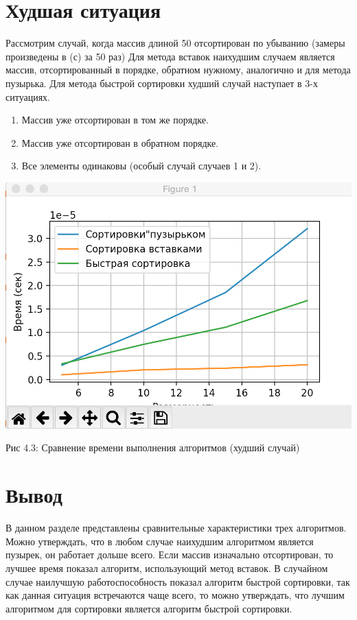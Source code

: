 \documentclass[12pt]{report}
\begin{document}
\section{Худшая ситуация}
Рассмотрим случай, когда массив длиной 50 отсортирован по убыванию (замеры произведены в (с) за 50 раз) \newline
Для метода вставок наихудшим случаем является массив, отсортированный в порядке, обратном нужному, аналогично и для метода пузырька. 
Для метода быстрой сортировки худший случай наступает в 3-х ситуациях.
	\begin{enumerate}
	\item Массив уже отсортирован в том же порядке. 
	\item Массив уже отсортирован в обратном порядке. 
	\item Все элементы одинаковы (особый случай случаев 1 и 2).
	\end{enumerate}
\begin{center}
		\includegraphics[scale=0.6]{Worst.png}
		
			Рис 4.3: Сравнение времени выполнения алгоритмов (худший случай)
\end{center}




\section{Вывод}
В данном разделе представлены сравнительные характеристики трех алгоритмов. Можно утверждать, что в любом случае наихудшим алгоритмом является пузырек, он работает дольше всего. Если массив изначально отсортирован, то лучшее время показал алгоритм, использующий метод вставок. В случайном случае наилучшую работоспособность показал алгоритм быстрой сортировки, так как данная ситуация встречаются чаще всего, то можно утверждать, что лучшим алгоритмом для сортировки является алгоритм быстрой сортировки.
\end{document}
